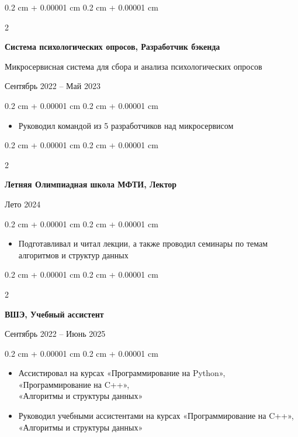 \documentclass[10pt, letterpaper]{article}
\newenvironment{highlights}{
    \begin{itemize}[
        topsep=0.10 cm,
        parsep=0.10 cm,
        partopsep=0pt,
        itemsep=0pt,
        leftmargin=0.4 cm + 10pt
    ]
}{
    \end{itemize}
} %
\newenvironment{onecolentry}{
    \begin{adjustwidth}{
        0.2 cm + 0.00001 cm
    }{
        0.2 cm + 0.00001 cm
    }
}{
    \end{adjustwidth}
} %
\newenvironment{twocolentry}[2][]{
    \onecolentry
    \def\secondColumn{#2}
    \setcolumnwidth{\fill, 5 cm}
    \begin{paracol}{2}
}{
    \switchcolumn \raggedleft \secondColumn
    \end{paracol}
    \endonecolentry
} %
\begin{document}
        \vspace{0.2 cm}

        \begin{twocolentry}{
            
        {Сентябрь 2022 – Май 2023}}
        \textbf{Система психологических опросов, Разработчик бэкенда}

        {Микросервисная система для сбора и анализа психологических опросов}
        \end{twocolentry}

        \vspace{0.10 cm}
        \begin{onecolentry}
            \begin{highlights}
                \item Руководил командой из 5 разработчиков над микросервисом
            \end{highlights}
        \end{onecolentry}

        \vspace{0.2 cm}

        \begin{twocolentry}{
            
        {Лето 2024}}
            \textbf{Летняя Олимпиадная школа МФТИ, Лектор}
        \end{twocolentry}

        \vspace{0.10 cm}
        \begin{onecolentry}
            \begin{highlights}
                \item Подготавливал и читал лекции, а также проводил семинары по темам алгоритмов и структур данных
            \end{highlights}
        \end{onecolentry}

        \vspace{0.2 cm}

        \begin{twocolentry}{
            
        {Сентябрь 2022 – Июнь 2025}}
            \textbf{ВШЭ, Учебный ассистент}
        \end{twocolentry}

        \vspace{0.10 cm}
        \begin{onecolentry}
            \begin{highlights}
                \item Ассистировал на курсах «Программирование на Python», «Программирование на C++», \\ «Алгоритмы и структуры данных»
                \item Руководил учебными ассистентами на курсах «Программирование на C++», \\ «Алгоритмы и структуры данных»
            \end{highlights}
        \end{onecolentry}
        
\end{document}
